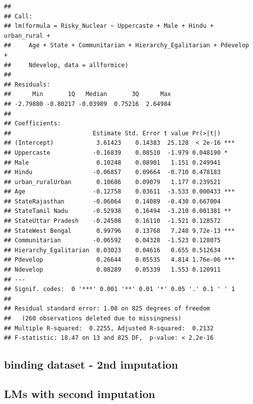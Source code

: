 \documentclass[
]{article}
\begin{document}
\begin{verbatim}
## 
## Call:
## lm(formula = Risky_Nuclear ~ Uppercaste + Male + Hindu + urban_rural + 
##     Age + State + Communitarian + Hierarchy_Egalitarian + Pdevelop + 
##     Ndevelop, data = allformice)
## 
## Residuals:
##      Min       1Q   Median       3Q      Max 
## -2.79880 -0.80217 -0.03989  0.75216  2.64984 
## 
## Coefficients:
##                       Estimate Std. Error t value Pr(>|t|)    
## (Intercept)            3.61423    0.14383  25.128  < 2e-16 ***
## Uppercaste            -0.16839    0.08510  -1.979 0.048190 *  
## Male                   0.10248    0.08901   1.151 0.249941    
## Hindu                 -0.06857    0.09664  -0.710 0.478183    
## urban_ruralUrban       0.10686    0.09079   1.177 0.239521    
## Age                   -0.12758    0.03611  -3.533 0.000433 ***
## StateRajasthan        -0.06064    0.14089  -0.430 0.667004    
## StateTamil Nadu       -0.52938    0.16494  -3.210 0.001381 ** 
## StateUttar Pradesh    -0.24508    0.16110  -1.521 0.128572    
## StateWest Bengal       0.99796    0.13768   7.248 9.72e-13 ***
## Communitarian         -0.06592    0.04328  -1.523 0.128075    
## Hierarchy_Egalitarian  0.03023    0.04616   0.655 0.512634    
## Pdevelop               0.26644    0.05535   4.814 1.76e-06 ***
## Ndevelop               0.08289    0.05339   1.553 0.120911    
## ---
## Signif. codes:  0 '***' 0.001 '**' 0.01 '*' 0.05 '.' 0.1 ' ' 1
## 
## Residual standard error: 1.08 on 825 degrees of freedom
##   (260 observations deleted due to missingness)
## Multiple R-squared:  0.2255, Adjusted R-squared:  0.2132 
## F-statistic: 18.47 on 13 and 825 DF,  p-value: < 2.2e-16
\end{verbatim}

\hypertarget{binding-dataset---2nd-imputation}{%
\subsection{binding dataset - 2nd
imputation}\label{binding-dataset---2nd-imputation}}

\hypertarget{lms-with-second-imputation}{%
\subsection{LMs with second
imputation}\label{lms-with-second-imputation}}
\end{document}
